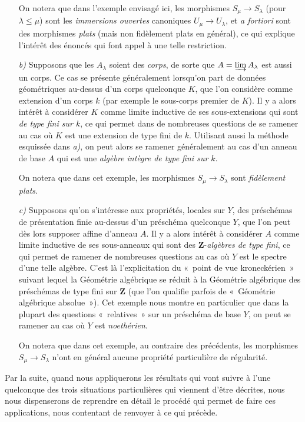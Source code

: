 \begin{env}[8.1.2]
\begin{enumerate}
On notera que dans l'exemple envisagé ici, les morphismes
$S_\mu\to S_\lambda$ (pour $\lambda\leq\mu$) sont les \emph{immersions
ouvertes} canoniques $U_\mu\to U_\lambda$, et \emph{a fortiori} sont des
morphismes \emph{plats} (mais non fidèlement plats en général), ce qui
explique l'intérêt des énoncés qui font appel à une telle restriction.

\item[\emph{b)}] Supposons que les $A_\lambda$ soient des \emph{corps}, de
sorte que $A=\varinjlim A_\lambda$ est aussi un corps. Ce cas se présente
généralement lorsqu'on part de données géométriques au-dessus d'un corps
quelconque $K$, que l'on considère comme extension d'un corps $k$ (par exemple
le sous-corps premier de $K$). Il y a alors intérêt à considérer $K$ comme
limite inductive de ses sous-extensions qui sont \emph{de type fini sur $k$},
ce qui permet dans de nombreuses questions de se ramener au cas où $K$ est
une extension de type fini de $k$. Utilisant aussi la méthode esquissée dans
\emph{a)}, on peut alors se ramener généralement au cas d'un anneau de base
$A$ qui est une \emph{algèbre intègre de type fini sur $k$}.

On notera que dans cet exemple, les morphismes $S_\mu\to S_\lambda$ sont
\emph{fidèlement plats}.

\item[\emph{c)}] Supposons qu'on s'intéresse aux propriétés, locales sur
$Y$, des préschémas de présentation finie au-dessus d'un préschéma quelconque
$Y$, que l'on peut dès lors supposer affine d'anneau $A$. Il y a alors intérêt
à considérer $A$ comme limite inductive de ses sous-anneaux qui sont des
$\mathbf Z$-\emph{algèbres de type fini}, ce qui permet de ramener de
nombreuses questions au cas où $Y$ est le spectre d'une telle algèbre. C'est
là l'explicitation du «~point de vue kroneckérien~» suivant lequel la
Géométrie algébrique se réduit à la Géométrie algébrique des préschémas de
type fini sur $\mathbf Z$ (que l'on qualifie parfois de
«~Géométrie algébrique absolue~»). Cet exemple nous montre en particulier que
dans la plupart des questions «~relatives~» sur un préschéma de base $Y$, on
peut se ramener au cas où $Y$ est \emph{noethérien}.

On notera que dans cet exemple, au contraire des précédents, les morphismes
$S_\mu\to S_\lambda$ n'ont en général aucune propriété particulière de
régularité.
\end{enumerate}

Par la suite, quand nous appliquerons les résultats qui vont suivre à l'une
quelconque des trois situations particulières qui viennent d'être décrites,
nous nous dispenserons de reprendre en détail le procédé qui permet de faire
ces applications, nous contentant de renvoyer à ce qui précède.
\end{env}

